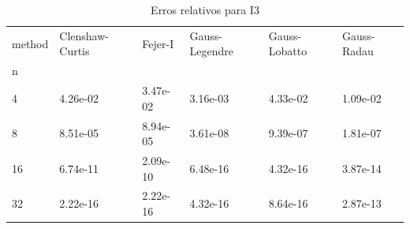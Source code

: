 \begin{table}
\centering
\caption{Erros relativos para I3}
\label{tab:errors_I3}
\begin{tabular}{llllll}
\toprule
method & Clenshaw-Curtis &   Fejer-I & Gauss-Legendre & Gauss-Lobatto & Gauss-Radau \\
n  &                 &           &                &               &             \\
\midrule
4  &        4.26e-02 &  3.47e-02 &       3.16e-03 &      4.33e-02 &    1.09e-02 \\
8  &        8.51e-05 &  8.94e-05 &       3.61e-08 &      9.39e-07 &    1.81e-07 \\
16 &        6.74e-11 &  2.09e-10 &       6.48e-16 &      4.32e-16 &    3.87e-14 \\
32 &        2.22e-16 &  2.22e-16 &       4.32e-16 &      8.64e-16 &    2.87e-13 \\
\bottomrule
\end{tabular}
\end{table}
